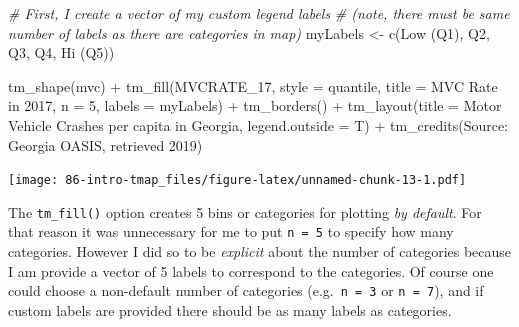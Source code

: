 \documentclass[
]{book}
\newenvironment{Shaded}{\begin{snugshade}}{\end{snugshade}}
\newcommand{\AttributeTok}[1]{\textcolor[rgb]{0.77,0.63,0.00}{#1}}
\newcommand{\CommentTok}[1]{\textcolor[rgb]{0.56,0.35,0.01}{\textit{#1}}}
\newcommand{\DecValTok}[1]{\textcolor[rgb]{0.00,0.00,0.81}{#1}}
\newcommand{\FunctionTok}[1]{\textcolor[rgb]{0.00,0.00,0.00}{#1}}
\newcommand{\NormalTok}[1]{#1}
\newcommand{\OtherTok}[1]{\textcolor[rgb]{0.56,0.35,0.01}{#1}}
\newcommand{\SpecialCharTok}[1]{\textcolor[rgb]{0.00,0.00,0.00}{#1}}
\newcommand{\StringTok}[1]{\textcolor[rgb]{0.31,0.60,0.02}{#1}}
\newenvironment{rmdnote}[1]
  {
  \begin{itemize}
  \renewcommand{\labelitemi}{
    \raisebox{-.7\height}[0pt][0pt]{
      {\setkeys{Gin}{width=3em,keepaspectratio}\texttt{[image: images/\#1]}}
    }
  }
  \setlength{\fboxsep}{1em}
  \begin{note}
  \item
  }
  {
  \end{note}
  \end{itemize}
  }
\begin{document}
\begin{Shaded}
\begin{Highlighting}[]
  \CommentTok{\# First, I create a vector of my custom legend labels}
  \CommentTok{\# (note, there must be same number of labels as there are categories in map)}
\NormalTok{myLabels }\OtherTok{\textless{}{-}} \FunctionTok{c}\NormalTok{(}\StringTok{\textquotesingle{}Low (Q1)\textquotesingle{}}\NormalTok{, }\StringTok{\textquotesingle{}Q2\textquotesingle{}}\NormalTok{, }\StringTok{\textquotesingle{}Q3\textquotesingle{}}\NormalTok{, }\StringTok{\textquotesingle{}Q4\textquotesingle{}}\NormalTok{, }\StringTok{\textquotesingle{}Hi (Q5)\textquotesingle{}}\NormalTok{)}

\FunctionTok{tm\_shape}\NormalTok{(mvc) }\SpecialCharTok{+}
  \FunctionTok{tm\_fill}\NormalTok{(}\StringTok{\textquotesingle{}MVCRATE\_17\textquotesingle{}}\NormalTok{,}
          \AttributeTok{style =} \StringTok{\textquotesingle{}quantile\textquotesingle{}}\NormalTok{,}
          \AttributeTok{title =} \StringTok{\textquotesingle{}MVC Rate in 2017\textquotesingle{}}\NormalTok{,}
          \AttributeTok{n =} \DecValTok{5}\NormalTok{, }
          \AttributeTok{labels =}\NormalTok{ myLabels) }\SpecialCharTok{+}
  \FunctionTok{tm\_borders}\NormalTok{() }\SpecialCharTok{+}
\FunctionTok{tm\_layout}\NormalTok{(}\AttributeTok{title =} \StringTok{\textquotesingle{}Motor Vehicle Crashes per capita in Georgia\textquotesingle{}}\NormalTok{,}
          \AttributeTok{legend.outside =}\NormalTok{ T) }\SpecialCharTok{+}
\FunctionTok{tm\_credits}\NormalTok{(}\StringTok{\textquotesingle{}Source: Georgia OASIS, retrieved 2019\textquotesingle{}}\NormalTok{)}
\end{Highlighting}
\end{Shaded}

\texttt{[image: 86-intro-tmap\_files/figure-latex/unnamed-chunk-13-1.pdf]}

\begin{rmdnote}{note}
The \texttt{tm\_fill()} option creates 5 bins or categories for plotting \emph{by default}. For that reason it was unnecessary for me to put \texttt{n\ =\ 5} to specify how many categories. However I did so to be \emph{explicit} about the number of categories because I am provide a vector of 5 labels to correspond to the categories. Of course one could choose a non-default number of categories (e.g.~\texttt{n\ =\ 3} or \texttt{n\ =\ 7}), and if custom labels are provided there should be as many labels as categories.

\end{rmdnote}
\end{document}
